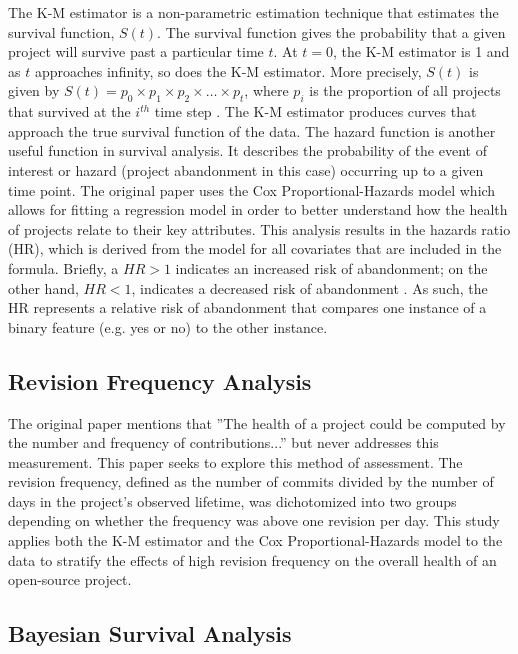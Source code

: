\documentclass[acmconf]{acmart}
\begin{document}
The K-M estimator is a non-parametric estimation technique that estimates the survival function, $S(t)$.
The survival function gives the probability that a given project will survive past a particular time $t$.
At $t = 0$, the K-M estimator is 1 and as $t$ approaches infinity, so does the K-M estimator.
More precisely, $S(t)$ is given by  $S(t) = p_0 \times p_1 \times p_2 \times \dots \times p_t$, where $p_i$ is the proportion of all projects that survived at the $i^{th}$ time step \cite{kaplan1958nonparametric}.
The K-M estimator produces curves that approach the true survival function of the data.
The hazard function is another useful function in survival analysis. It describes the probability of the event of interest or hazard (project abandonment in this case) occurring up to a given time point.
The original paper uses the Cox Proportional-Hazards model which allows for fitting a regression model in order to better understand how the health of projects relate to their key attributes. 
This analysis results in the hazards ratio (HR), which is derived from the model for all covariates that are included in the formula. 
Briefly, a $HR > 1$ indicates an increased risk of abandonment; on the other hand, $HR < 1$, indicates a decreased risk of abandonment \cite{cox1972regression}. 
As such, the HR represents a relative risk of abandonment that compares one instance of a binary feature (e.g. yes or no) to the other instance.

\subsection{Revision Frequency Analysis} \label{revisionFreq}

The original paper mentions that ''The health of a project could be computed by the number and frequency of contributions...'' but never addresses this measurement.
This paper seeks to explore this method of assessment. 
The revision frequency, defined as the number of commits divided by the number of days in the project's observed lifetime, was dichotomized into two groups depending on whether the frequency was above one revision per day.
This study applies both the K-M estimator and the Cox Proportional-Hazards model to the data to stratify the effects of high revision frequency on the overall health of an open-source project.

\subsection{Bayesian Survival Analysis}
\end{document}
